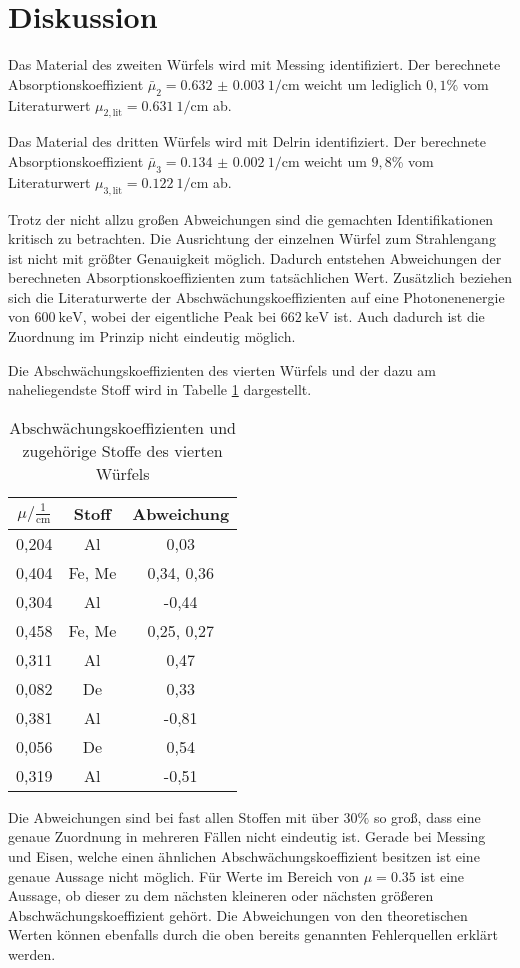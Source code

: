 \section{Diskussion}
\label{sec:Diskussion}
Das Material des zweiten Würfels wird mit Messing identifiziert. Der berechnete
Absorptionskoeffizient $\bar\mu_2 = \SI{0.632(3)}{1\per\centi\meter}$ weicht um
lediglich $0,1$\% vom Literaturwert $\mu_{2, \mathrm{ lit}} = \SI{0.631}{1\per\centi\meter}$
ab.

Das Material des dritten Würfels wird mit Delrin identifiziert. Der berechnete
Absorptionskoeffizient $\bar\mu_3 = \SI{0.134(2)}{1\per\centi\meter}$ weicht um
$9,8$\% vom Literaturwert $\mu_{3, \mathrm{ lit}} = \SI{0.122}{1\per\centi\meter}$
ab.

Trotz der nicht allzu großen Abweichungen sind die gemachten Identifikationen
kritisch zu betrachten. Die Ausrichtung der einzelnen Würfel zum Strahlengang
ist nicht mit größter Genauigkeit möglich. Dadurch entstehen Abweichungen der
berechneten Absorptionskoeffizienten zum tatsächlichen Wert.
Zusätzlich beziehen sich die Literaturwerte der Abschwächungskoeffizienten auf
eine Photonenenergie von $\SI{600}{\kilo\eV}$, wobei der eigentliche Peak
bei $\SI{662}{\kilo\eV}$ ist. Auch dadurch ist die Zuordnung im Prinzip nicht
eindeutig möglich.

Die Abschwächungskoeffizienten des vierten Würfels und der dazu am naheliegendste Stoff wird in
Tabelle \ref{tab:abw} dargestellt.

\begin{table}[H]
  \centering
  \caption{Abschwächungskoeffizienten und zugehörige Stoffe des vierten Würfels}
  \label{tab:abw}
  \begin{tabular}{c c c}
    \toprule
    $\mu/ \mathrm{\frac{1}{cm}}$ & Stoff & Abweichung   \\
    \midrule
    0,204      &  Al     &   0,03    \\
    0,404      &  Fe, Me &   0,34, 0,36    \\
    0,304      &  Al     &  -0,44    \\
    0,458      &  Fe, Me &   0,25, 0,27    \\
    0,311      &  Al     &   0,47    \\
    0,082      &  De     &   0,33    \\
    0,381      &  Al     &  -0,81    \\
    0,056      &  De     &   0,54   \\
    0,319      &  Al     &  -0,51  \\
    \bottomrule
  \end{tabular}
\end{table}

Die Abweichungen sind bei fast allen Stoffen mit über $30\%$ so groß, dass
eine genaue Zuordnung in mehreren Fällen nicht eindeutig ist. Gerade bei Messing und
Eisen, welche einen ähnlichen Abschwächungskoeffizient besitzen ist eine genaue
Aussage nicht möglich. Für Werte im Bereich von $\mu = 0.35$ ist eine Aussage, ob
dieser zu dem nächsten kleineren oder nächsten größeren Abschwächungskoeffizient
gehört. Die Abweichungen von den theoretischen Werten können ebenfalls durch
die oben bereits genannten Fehlerquellen erklärt werden.
